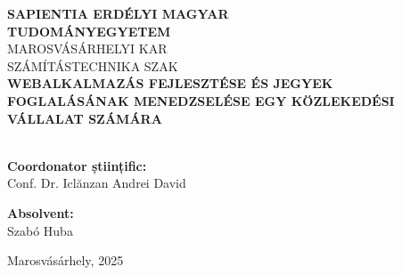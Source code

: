 \begin{titlepage}
    \centering
    \vspace*{2cm}

    {\Large \textbf{SAPIENTIA ERDÉLYI MAGYAR}}\\[0.2cm]
    {\Large \textbf{TUDOMÁNYEGYETEM}}\\[0.5cm]
    {\large MAROSVÁSÁRHELYI KAR}\\[0.2cm]
    {\large SZÁMÍTÁSTECHNIKA SZAK}\\[3cm]

    {\LARGE \textbf{WEBALKALMAZÁS FEJLESZTÉSE ÉS JEGYEK FOGLALÁSÁNAK MENEDZSELÉSE EGY KÖZLEKEDÉSI VÁLLALAT SZÁMÁRA}}\\[0.5cm] 
    {\Large \textbf{}}\\[4cm]

    \noindent
    \begin{minipage}[t]{0.48\textwidth}
        \raggedright
        \textbf{Coordonator științific:}\\[1em]
        Conf. Dr. Iclănzan Andrei David
    \end{minipage}
    \hfill
    \begin{minipage}[t]{0.48\textwidth}
        \raggedleft
        \textbf{Absolvent:}\\[1em]
        Szabó Huba
    \end{minipage}


    \vfill

    {\large Marosvásárhely, 2025}

\end{titlepage}
